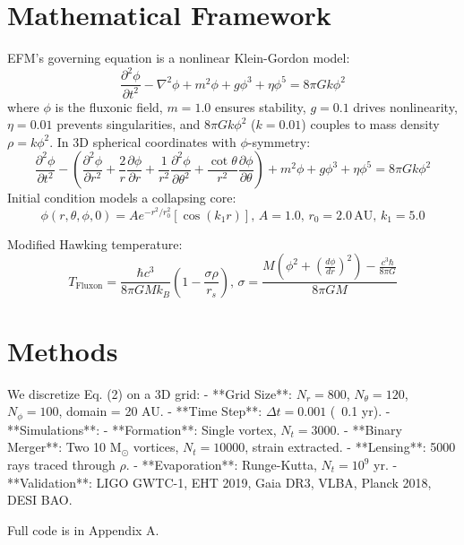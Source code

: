 \documentclass[11pt]{article}
\begin{document}
\section{Mathematical Framework}
EFM’s governing equation is a nonlinear Klein-Gordon model:
\begin{equation}
\frac{\partial^2 \phi}{\partial t^2} - \nabla^2 \phi + m^2 \phi + g \phi^3 + \eta \phi^5 = 8\pi G k \phi^2
\end{equation}
where \(\phi\) is the fluxonic field, \(m = 1.0\) ensures stability, \(g = 0.1\) drives nonlinearity, \(\eta = 0.01\) prevents singularities, and \(8\pi G k \phi^2\) (\(k = 0.01\)) couples to mass density \(\rho = k \phi^2\). In 3D spherical coordinates with \(\phi\)-symmetry:
\begin{equation}
\frac{\partial^2 \phi}{\partial t^2} - \left( \frac{\partial^2 \phi}{\partial r^2} + \frac{2}{r} \frac{\partial \phi}{\partial r} + \frac{1}{r^2} \frac{\partial^2 \phi}{\partial \theta^2} + \frac{\cot\theta}{r^2} \frac{\partial \phi}{\partial \theta} \right) + m^2 \phi + g \phi^3 + \eta \phi^5 = 8\pi G k \phi^2
\end{equation}
Initial condition models a collapsing core:
\begin{equation}
\phi(r, \theta, \phi, 0) = A e^{-r^2 / r_0^2} \left[ \cos(k_1 r) \right], \, A = 1.0, \, r_0 = 2.0 \, \text{AU}, \, k_1 = 5.0
\end{equation}

Modified Hawking temperature:
\begin{equation}
T_{\text{Fluxon}} = \frac{\hbar c^3}{8 \pi G M k_B} \left( 1 - \frac{\sigma \rho}{r_s} \right), \, \sigma = \frac{M (\phi^2 + (\frac{d\phi}{dr})^2) - \frac{c^3 \hbar}{8 \pi G}}{8 \pi G M}
\end{equation}

\section{Methods}
We discretize Eq. (2) on a 3D grid:
- **Grid Size**: \(N_r = 800\), \(N_\theta = 120\), \(N_\phi = 100\), domain = 20 AU.
- **Time Step**: \(\Delta t = 0.001\) (~0.1 yr).
- **Simulations**:
  - **Formation**: Single vortex, \(N_t = 3000\).
  - **Binary Merger**: Two 10 M$_\odot$ vortices, \(N_t = 10000\), strain extracted.
  - **Lensing**: 5000 rays traced through \(\rho\).
  - **Evaporation**: Runge-Kutta, \(N_t = 10^9\) yr.
- **Validation**: LIGO GWTC-1, EHT 2019, Gaia DR3, VLBA, Planck 2018, DESI BAO.

Full code is in Appendix A.
\end{document}
